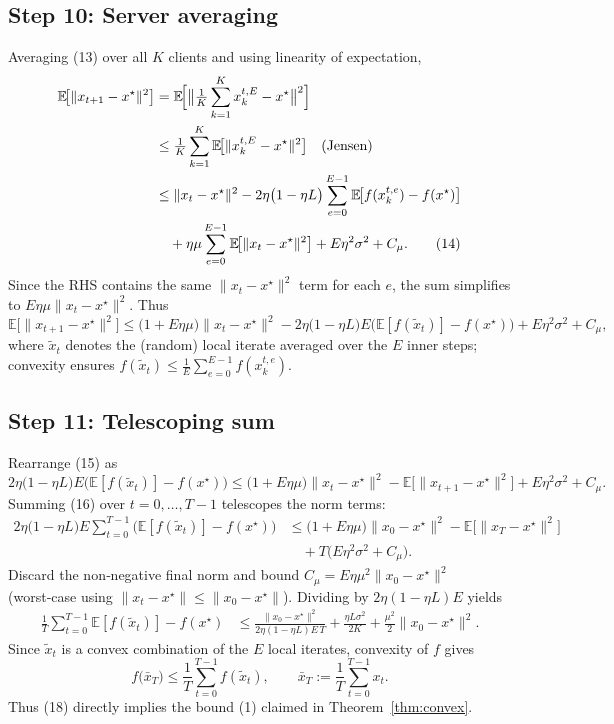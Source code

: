 \documentclass{article}
\newcommand{\E}{\mathbb{E}}
\begin{document}
\subsection*{Step 10: Server averaging}
Averaging (13) over all $K$ clients and using linearity of expectation,
\begin{align}
\E\!\bigl[\|x_{t+1}-x^\star\|^2\bigr] 
&= \E\!\Bigl[\bigl\|\tfrac1K\sum_{k=1}^{K}x_{k}^{t,E}-x^\star\bigr\|^2\Bigr] \nonumber\\
&\le \tfrac1K\sum_{k=1}^{K}\E\!\bigl[\|x_{k}^{t,E}-x^\star\|^2\bigr] \quad\text{(Jensen)} \nonumber\\
&\le \|x_t-x^\star\|^2 
   -2\eta\bigl(1-\eta L\bigr)\sum_{e=0}^{E-1}\E\!\bigl[f(x_{k}^{t,e})-f(x^\star)\bigr] \nonumber\\
&\quad +\eta\mu\sum_{e=0}^{E-1}\E\!\bigl[\|x_{t}-x^\star\|^2\bigr] 
   +E\eta^2\sigma^2 + C_{\mu}. \tag{14}
\end{align}
Since the RHS contains the same $\|x_t-x^\star\|^2$ term for each $e$, the sum simplifies to $E\eta\mu\|x_t-x^\star\|^2$.
Thus
\[
\E\!\bigl[\|x_{t+1}-x^\star\|^2\bigr] 
\le \bigl(1+E\eta\mu\bigr)\|x_t-x^\star\|^2
   -2\eta\bigl(1-\eta L\bigr)E\bigl(\E[f(\tilde x_t)]-f(x^\star)\bigr)
   +E\eta^2\sigma^2 + C_{\mu}, \tag{15}
\]
where $\tilde x_t$ denotes the (random) local iterate averaged over the $E$ inner steps; convexity ensures $f(\tilde x_t)\le \frac1E\sum_{e=0}^{E-1} f(x_{k}^{t,e})$.

\subsection*{Step 11: Telescoping sum}
Rearrange (15) as
\[
2\eta\bigl(1-\eta L\bigr)E\bigl(\E[f(\tilde x_t)]-f(x^\star)\bigr)
\le \bigl(1+E\eta\mu\bigr)\|x_t-x^\star\|^2-\E\!\bigl[\|x_{t+1}-x^\star\|^2\bigr]
   +E\eta^2\sigma^2 + C_{\mu}. \tag{16}
\]
Summing (16) over $t=0,\dots,T-1$ telescopes the norm terms:
\begin{align}
2\eta\bigl(1-\eta L\bigr)E\sum_{t=0}^{T-1}\bigl(\E[f(\tilde x_t)]-f(x^\star)\bigr)
&\le \bigl(1+E\eta\mu\bigr)\|x_0-x^\star\|^2 - \E\!\bigl[\|x_T-x^\star\|^2\bigr] \nonumber\\
&\quad + T\bigl(E\eta^2\sigma^2 + C_{\mu}\bigr). \tag{17}
\end{align}
Discard the non‑negative final norm and bound $C_{\mu}=E\eta\mu^2\|x_0-x^\star\|^2$ (worst‑case using $ \|x_t-x^\star\|\le\|x_0-x^\star\|$).  Dividing by $2\eta(1-\eta L)E$ yields
\begin{align}
\frac1T\sum_{t=0}^{T-1}\E[f(\tilde x_t)]-f(x^\star)
&\le \frac{\|x_0-x^\star\|^2}{2\eta(1-\eta L)E\,T}
   +\frac{\eta L\sigma^2}{2K}
   +\frac{\mu^2}{2}\|x_0-x^\star\|^2 . \tag{18}
\end{align}
Since $\tilde x_t$ is a convex combination of the $E$ local iterates, convexity of $f$ gives
\[
f\bigl(\bar x_T\bigr)\le\frac1T\sum_{t=0}^{T-1}f(\tilde x_t),\qquad 
\bar x_T:=\frac1T\sum_{t=0}^{T-1}x_t .
\]
Thus (18) directly implies the bound (1) claimed in Theorem~\ref{thm:convex}.
\end{document}

